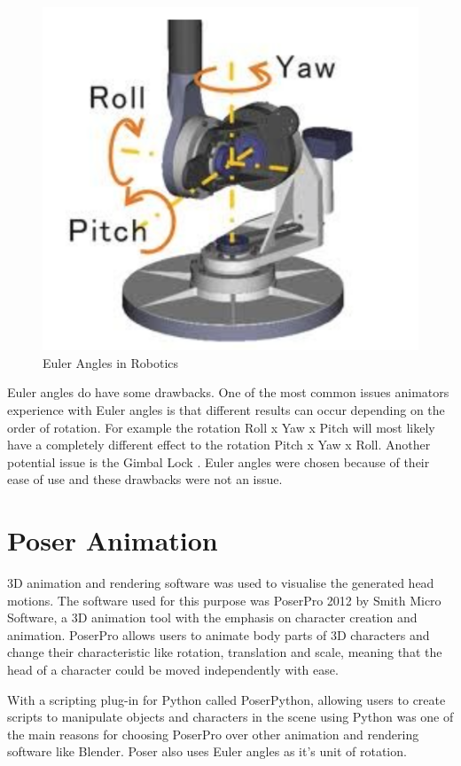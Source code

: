 \documentclass[bsc,frontabs,twoside,singlespacing,parskip]{infthesis}
\begin{document}
\begin{figure}[h!]
	\centering
	\includegraphics[width=.5\textwidth]{euler_angles.png}
	\caption{Euler Angles in Robotics}
\end{figure}

Euler angles do have some drawbacks. One of the most common issues animators experience with Euler angles is that different results can occur depending on the order of rotation. For example the rotation Roll x Yaw x Pitch will most likely have a completely different effect to the rotation Pitch x Yaw x Roll. \cite{quartionions} Another potential issue is the Gimbal Lock \cite{gimbal}. Euler angles were chosen because of their ease of use and these drawbacks were not an issue.

\section{Poser Animation}

3D animation and rendering software was used to visualise the generated head motions. The software used for this purpose was PoserPro 2012 by Smith Micro Software, a 3D animation tool with the emphasis on character creation and animation. PoserPro allows users to animate body parts of 3D characters and change their characteristic like rotation, translation and scale, meaning that the head of a character could be moved independently with ease.

With a scripting plug-in for Python called PoserPython, \cite{poser_python} allowing users to create scripts to manipulate objects and characters in the scene using Python was one of the main reasons for choosing PoserPro over other animation and rendering software like Blender. Poser also uses Euler angles as it's unit of rotation.
\end{document}
